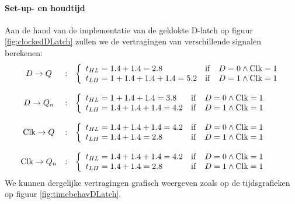 \paragraph{Set-up- en houdtijd}
Aan de hand van de implementatie van de geklokte D-latch op figuur \ref{fig:clockedDLatch} zullen we de vertragingen van verschillende signalen berekenen:
\begin{equation}
\begin{array}{ccl}
D\rightarrow Q&:&\left\{\begin{array}{lll}
t_{HL}=1.4+1.4=2.8&\operatorname{if}&D=0\wedge\mbox{Clk}=1\\
t_{LH}=1+1.4+1.4+1.4=5.2&\operatorname{if}&D=1\wedge\mbox{Clk}=1
\end{array}\right.\\\\
D\rightarrow Q_n&:&\left\{\begin{array}{lll}
t_{HL}=1+1.4+1.4=3.8&\operatorname{if}&D=0\wedge\mbox{Clk}=1\\
t_{LH}=1.4+1.4+1.4=4.2&\operatorname{if}&D=1\wedge\mbox{Clk}=1
\end{array}\right.\\\\
\mbox{Clk}\rightarrow Q&:&\left\{\begin{array}{lll}
t_{HL}=1.4+1.4+1.4=4.2&\operatorname{if}&D=0\wedge\mbox{Clk}=1\\
t_{LH}=1.4+1.4=2.8&\operatorname{if}&D=1\wedge\mbox{Clk}=1
\end{array}\right.\\\\
\mbox{Clk}\rightarrow Q_n&:&\left\{\begin{array}{lll}
t_{HL}=1.4+1.4+1.4=4.2&\operatorname{if}&D=0\wedge\mbox{Clk}=1\\
t_{LH}=1.4+1.4=2.8&\operatorname{if}&D=1\wedge\mbox{Clk}=1
\end{array}\right.
\end{array}
\end{equation}
We kunnen dergelijke vertragingen grafisch weergeven zoals op de tijdsgrafieken op figuur \ref{fig:timebehavDLatch}.
